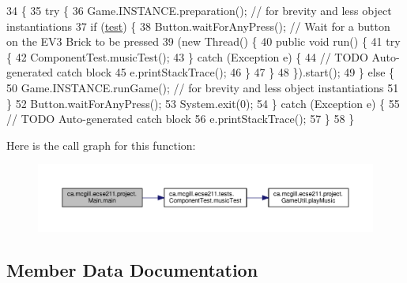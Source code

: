 \begin{DoxyCode}
34                                          \{
35     \textcolor{keywordflow}{try} \{
36       Game.INSTANCE.preparation(); \textcolor{comment}{// for brevity and less object instantiations}
37       \textcolor{keywordflow}{if} (\hyperlink{classca_1_1mcgill_1_1ecse211_1_1project_1_1_main_af6f7b8fffddcf855f74fe128d2e23ea1}{test}) \{
38         Button.waitForAnyPress(); \textcolor{comment}{// Wait for a button on the EV3 Brick to be pressed}
39         (\textcolor{keyword}{new} Thread() \{
40           \textcolor{keyword}{public} \textcolor{keywordtype}{void} run() \{
41             \textcolor{keywordflow}{try} \{
42               ComponentTest.musicTest();
43             \} \textcolor{keywordflow}{catch} (Exception e) \{
44               \textcolor{comment}{// TODO Auto-generated catch block}
45               e.printStackTrace();
46             \}
47           \}
48         \}).start();
49       \} \textcolor{keywordflow}{else} \{
50         Game.INSTANCE.runGame(); \textcolor{comment}{// for brevity and less object instantiations}
51       \}
52       Button.waitForAnyPress();
53       System.exit(0);
54     \} \textcolor{keywordflow}{catch} (Exception e) \{
55       \textcolor{comment}{// TODO Auto-generated catch block}
56       e.printStackTrace();
57     \}
58   \}
\end{DoxyCode}
Here is the call graph for this function\+:
\nopagebreak
\begin{figure}[H]
\begin{center}
\leavevmode
\includegraphics[width=350pt]{classca_1_1mcgill_1_1ecse211_1_1project_1_1_main_af681b5dc675c13ed284071cc135f5fd3_cgraph}
\end{center}
\end{figure}


\subsection{Member Data Documentation}
\mbox{\label{classca_1_1mcgill_1_1ecse211_1_1project_1_1_main_af6f7b8fffddcf855f74fe128d2e23ea1}} 
